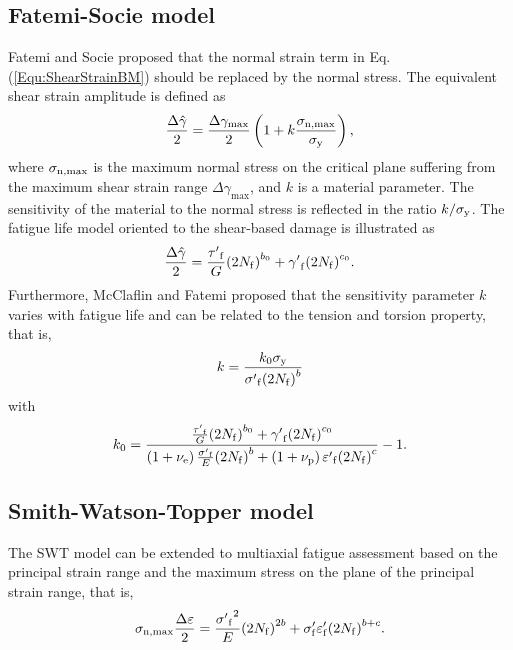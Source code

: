 \documentclass[preprint,5p,twocolumn,10pt,sort&compress]{elsarticle}
\begin{document}
\subsection{Fatemi-Socie model}
Fatemi and Socie \cite{Fatemi1988} proposed that the normal strain term in Eq. (\ref{Equ:ShearStrainBM}) should be replaced by the normal stress.
The equivalent shear strain amplitude is defined as
\begin{equation}
\frac{{\Delta \hat \gamma }}{2} = \frac{{\Delta {\gamma _{\max }}}}{2}\left( {1 + k\frac{{{\sigma _{\rm n,\max}}}}{{{\sigma _{\rm y}}}}} \right),
\end{equation}
where
$\sigma _{\rm n,\max}$ is the maximum normal stress on the critical plane suffering from the maximum shear strain range $\Delta {\gamma _{\max}}$, and $k$ is a material parameter. The sensitivity of the material to the normal stress is reflected in the ratio $k/\sigma _{\rm y}$.
The fatigue life model oriented to the shear-based damage is illustrated as
\begin{equation}
\frac{{\Delta \hat \gamma }}{2} = \frac{{{{\tau '}_{\rm f}}}}{G}{\left( {2{N_{\rm f}}} \right)^{{b_0}}} + {{\gamma '}_{\rm f}}{\left( {2{N_{\rm f}}} \right)^{{c_0}}}.
\end{equation}
Furthermore, McClaflin and Fatemi \cite{McClaflin2004} proposed that the sensitivity parameter $k$ varies with fatigue life and can be related to the tension and torsion property, that is,
\begin{equation}
k =  \frac{{k_0 {\sigma _{\rm y}}}}{{{{\sigma '}_{\rm f}}{{\left( {2{N_{\rm f}}} \right)}^b}}}
\end{equation}
with
\[
k_0 =  {\frac{{\frac{{{{\tau '}_{\rm f}}}}{G}{{\left( {2{N_{\rm f}}} \right)}^{{b_0}}} + {{\gamma '}_{\rm f}}{{\left( {2{N_{\rm f}}} \right)}^{{c_0}}}}}{{\left( {1 + {\nu _{\rm e}}} \right)\frac{{{{\sigma '}_{\rm f}}}}{E}{{\left( {2{N_{\rm f}}} \right)}^b} + \left( {1 + {\nu _{\rm p}}} \right){{\varepsilon '}_{\rm f}}{{\left( {2{N_{\rm f}}} \right)}^c}}} - 1} .
\]


\subsection{Smith-Watson-Topper model}
The SWT model \cite{smith1970stress} can be extended to multiaxial fatigue assessment based on the principal strain range and the maximum stress on the plane of the principal strain range, that is,
\[
{\sigma _{\rm n, \max}}\frac{{\Delta \varepsilon }}{2} = \frac{{{{\sigma '}_{\rm f}}^2}}{E}{\left( {2{N_{\rm f}}} \right)^{2b}} + {\sigma '_{\rm f}}{\varepsilon '_{\rm f}}{\left( {2{N_{\rm f}}} \right)^{b + c}}.
\]
\end{document}

